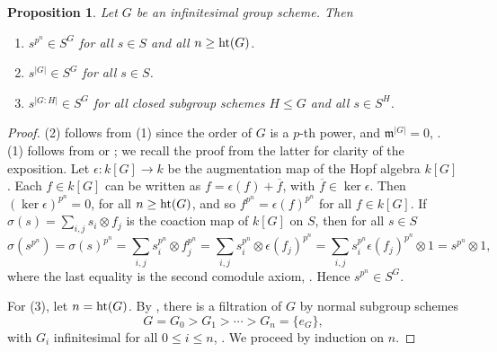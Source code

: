 \documentclass[12pt]{amsart}
\newtheorem{proposition}[theorem]{Proposition}
\theoremstyle{definition}
\begin{document}
\begin{proposition}\label{prop:height}
	Let $G$ be an infinitesimal group scheme. Then
	\begin{enumerate}
		\item $s^{p^n}\in S^{G}$ for all $s\in S$ and all $n\geq{\rm ht}(G)$.
		\item $s^{|G|}\in S^{G}$ for all $s\in S$.
		\item $s^{|G{:}H|}\in S^G$ for all closed subgroup schemes $H\leq G$ and all $s\in S^H$.
	\end{enumerate}
\end{proposition}
\begin{proof}
	(2) follows from (1) since the order of $G$ is a $p$-th power, \cite[11.30]{MR3729270} and $\mathfrak{m}^{|G|}=0$, \cite[11.32]{MR3729270}. (1) follows from \cite[1.5.2]{MR4844642} or \cite[2.8]{MR4692505}; we recall the proof from the latter for clarity of the exposition. Let $\epsilon:k[G]\rightarrow k$ be the augmentation map of the Hopf algebra $k[G]$. Each $f\in k[G]$ can be written as $f=\epsilon(f)+\overline{f}$, with $\overline{f}\in\ker\epsilon$. Then $(\ker\epsilon)^{p^n}=0$, for all $n\geq{\rm ht}(G)$, and so $f^{p^n}=\epsilon(f)^{p^n}$ for all $f\in k[G]$.
	If $\sigma(s)=\sum_{i,j} s_i\otimes f_j$ is the coaction map of $k[G]$ on $S$, then for all $s\in S$
	\[
	\sigma(s^{p^n})
	=\sigma(s)^{p^n}
	=\sum_{i,j} s_i^{p^n}\otimes f_j^{p^n}
	=\sum_{i,j} s_i^{p^n}\otimes \epsilon(f_j)^{p^n}
	=\sum_{i,j} s_i^{p^n}\epsilon(f_j)^{p^n}\otimes  1
	=s^{p^n}\otimes 1,
	\]
	where the last equality is the second comodule axiom, \cite[I.2.8(3)]{MR2015057}. Hence $s^{p^n}\in S^{G}$.
	
	For (3), let $n={\rm ht}(G)$. By \cite[I.9.4(1)]{MR2015057}, there is a filtration of $G$ by normal subgroup schemes
	\[
	G=G_0>G_1>\cdots>G_n=\{e_G\},
	\]
	with $G_i$ infinitesimal for all $0\leq i\leq n$, \cite[I.9.6(1)]{MR2015057}. We proceed by induction on $n$. 
	

\end{proof}
\end{document}
